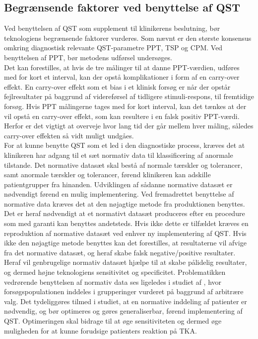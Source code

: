 \subsection{Begrænsende faktorer ved benyttelse af QST}
Ved benyttelsen af QST som supplement til klinikerens beslutning, bør teknologiens begrænsende faktorer vurderes. Som nævnt er den største konsensus omkring diagnostisk relevante QST-parametre PPT, TSP og CPM. Ved benyttelsen af PPT, bør metodens udførsel undersøges. \\
Det kan forestilles, at hvis de tre målinger til at danne PPT-værdien, udføres med for kort et interval, kan der opstå komplikationer i form af en carry-over effekt. En carry-over effekt som et bias i et klinisk forsøg er når der opstår fejlresultater på baggrund af videreførsel af tidligere stimuli-respons, til fremtidige forsøg. Hvis PPT målingerne tages med for kort interval, kan det tænkes at der vil opstå en carry-over effekt, som kan resultere i en falsk positiv PPT-værdi. Herfor er det vigtigt at overveje hvor lang tid der går mellem hver måling, således carry-over effekten så vidt muligt undgåes. \citep{Porta2008} \\
For at kunne benytte QST som et led i den diagnostiske process, kræves det at klinikeren har adgang til et sæt normativ data til klassificering af anormale tilstande. Det normative datasæt skal bestå af normale tærskler og tolerancer, samt anormale tærskler og tolerancer, førend klinikeren kan adskille patientgrupper fra hinanden. Udviklingen af sådanne normative datasæt er nødvendigt førend en mulig implementering. Ved fremadrettet benyttelse af normative data kræves det at den nøjagtige metode fra produktionen benyttes. Det er heraf nødvendigt at et normativt datasæt produceres efter en procedure som med garanti kan benyttes andetsteds. Hvis ikke dette er tilfældet kræves en reproduktion af normative datasæt ved enhver ny implementering af QST. Hvis ikke den nøjagtige metode benyttes kan det forestilles, at resultaterne vil afvige fra det normative datasæt, og heraf skabe falsk negative/positive resultater. Heraf vil genbrugelige normativ datasæt  hjælpe til at skabe pålidelig resultater, og dermed højne teknologiens sensitivitet og specificitet.  \citep{Yarnitsky1997} Problematikken vedrørende benyttelsen af normativ data ses ligeledes i studiet af , hvor forsøgspopulationen inddeles i grupperinger vurderet på baggrund af arbitrære valg. Det tydeliggøres tilmed i studiet, at en normative inddeling af patienter er nødvendig, og bør optimeres og gøres generaliserbar, førend implementering af QST. Optimeringen skal bidrage til at øge sensitiviteten og dermed øge muligheden for at kunne forudsige patienters reaktion på TKA. \\
